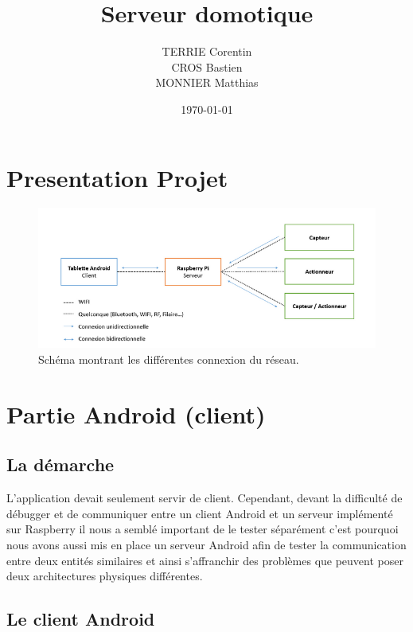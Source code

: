 \documentclass[a4paper,10pt]{article}
\title{Serveur domotique}
\author{TERRIE Corentin \\ CROS Bastien \\ MONNIER Matthias}
\date{\today}
\begin{document}

\tableofcontents
\clearpage


\section{Presentation Projet}

\begin{figure}[H]
\centering\includegraphics[scale=0.7]{images/Shema_projet.png}
\caption{Schéma montrant les différentes connexion du réseau.}
\end{figure}


\section{Partie Android (client)}
\subsection{La démarche}
L’application devait seulement servir de client. Cependant, devant la difficulté de débugger et de communiquer entre un client Android et un serveur implémenté sur Raspberry il nous a semblé important de le tester séparément c’est pourquoi nous avons aussi mis en place un serveur Android afin de tester la communication entre deux entités similaires et ainsi s’affranchir des problèmes que peuvent poser deux architectures physiques différentes.  
\subsection{Le client Android}
\end{document}
